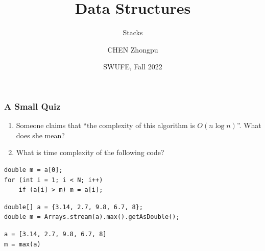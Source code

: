 \documentclass[aspectratio=169, 14pt]{beamer}
\title[Data Structures] %
{Data Structures}
\subtitle{Stacks}
\author[CHEN Zhongpu] %
{CHEN Zhongpu}
\institute[] %
{
  School of Computing and Artificial Intelligence \\
  \href{mailto:zpchen@swufe.edu.cn}{zpchen@swufe.edu.cn}
}
\date[] %
{SWUFE, Fall 2022}
\begin{document}
\frame{\titlepage}

\begin{frame}[fragile]
    \frametitle{A Small Quiz}
    \begin{enumerate}
        \item Someone claims that ``the complexity of this algorithm is $O(n\log{n})$''. What does she mean?
        \item What is time complexity of the following code?
    \end{enumerate}

\begin{verbatim}
double m = a[0];
for (int i = 1; i < N; i++)
    if (a[i] > m) m = a[i];
\end{verbatim}  

\end{frame}

\begin{frame}[fragile]
    \begin{verbatim}
double[] a = {3.14, 2.7, 9.8, 6.7, 8};
double m = Arrays.stream(a).max().getAsDouble();
    \end{verbatim}  

\begin{verbatim}
a = [3.14, 2.7, 9.8, 6.7, 8]
m = max(a)
\end{verbatim} 

\end{frame}
\end{document}
